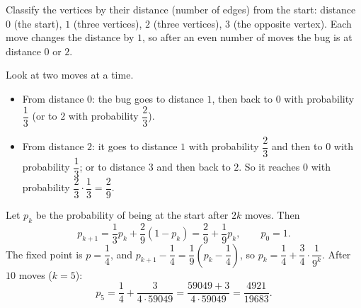 Classify the vertices by their distance (number of edges) from the start: distance $0$ (the start), $1$ (three vertices), $2$ (three vertices), $3$ (the opposite vertex). Each move changes the distance by $1$, so after an even number of moves the bug is at distance $0$ or $2$.

Look at two moves at a time.
\begin{itemize}
\item From distance $0$: the bug goes to distance $1$, then back to $0$ with probability $\dfrac{1}{3}$ (or to $2$ with probability $\dfrac{2}{3}$).
\item From distance $2$: it goes to distance $1$ with probability $\dfrac{2}{3}$ and then to $0$ with probability $\dfrac{1}{3}$; or to distance $3$ and then back to $2$. So it reaches $0$ with probability $\dfrac{2}{3}\cdot\dfrac{1}{3}=\dfrac{2}{9}$.
\end{itemize}
Let $p_k$ be the probability of being at the start after $2k$ moves. Then
\[p_{k+1}=\dfrac{1}{3}p_k+\dfrac{2}{9}(1-p_k)=\dfrac{2}{9}+\dfrac{1}{9}p_k,\qquad p_0=1.\]
The fixed point is $p=\dfrac{1}{4}$, and $p_{k+1}-\dfrac{1}{4}=\dfrac{1}{9}\left(p_k-\dfrac{1}{4}\right)$, so $p_k=\dfrac{1}{4}+\dfrac{3}{4}\cdot\dfrac{1}{9^k}$. After $10$ moves ($k=5$):
\[p_5=\dfrac{1}{4}+\dfrac{3}{4\cdot59049}=\dfrac{59049+3}{4\cdot59049}=\boxed{\dfrac{4921}{19683}}.\]
